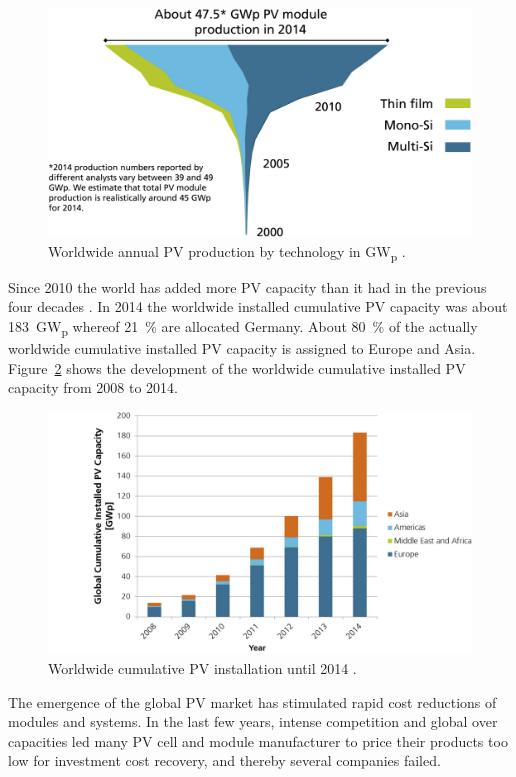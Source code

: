  \begin{figure}[htbp]  
\centering
\includegraphics[width=0.7\linewidth]{FIG/PV_Prod_by_Tech}
\caption[Worldwide annual PV production by technology.]{Worldwide annual PV production by technology in \si{\giga\watt}\textsubscript{p} \cite{FraunhoferISE2015}.}\label{PV_Prod_by_Tech}
\end{figure}
Since 2010 the world has added more PV capacity than it had in the previous four decades \cite{IEA2014c}. In 2014 the worldwide installed cumulative PV capacity was about \SI{183}{\giga\watt}\textsubscript{p} whereof \SI{21}{\percent} are allocated Germany. About \SI{80}{\percent} of the actually worldwide cumulative installed PV capacity is assigned to Europe and Asia. Figure~\ref{PV_Install_global} shows the development of the worldwide cumulative installed PV capacity from 2008 to 2014. \cite{FraunhoferISE2015}

\begin{figure}[htbp]  
\centering
\includegraphics[width=0.7\linewidth]{FIG/PV_Install_global}
\caption[Worldwide cumulative PV installation until 2014.]{Worldwide cumulative PV installation until 2014 \cite{FraunhoferISE2015}.}\label{PV_Install_global}
\end{figure}
The emergence of the global PV market has stimulated rapid cost reductions of modules and systems. In the last few years, intense competition and global over capacities led many PV cell and module manufacturer to price their products too low for investment cost recovery, and thereby several companies failed. 

